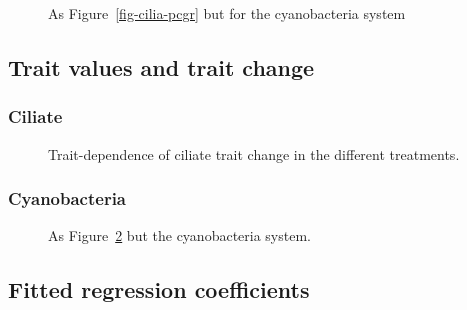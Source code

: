 \documentclass[
  letterpaper,
  DIV=11,
  numbers=noendperiod]{scrartcl}
\begin{document}
\begin{figure}


\caption{\label{fig-cyano-pcgr}As Figure~\ref{fig-cilia-pcgr} but for
the cyanobacteria system}

\end{figure}%

\subsection{Trait values and trait
change}\label{trait-values-and-trait-change}

\subsubsection{Ciliate}\label{ciliate-2}

\begin{figure}


\caption{\label{fig-cilia-dT}Trait-dependence of ciliate trait change in
the different treatments.}

\end{figure}%

\subsubsection{Cyanobacteria}\label{cyanobacteria-2}

\begin{figure}


\caption{\label{fig-cyano-dT}As Figure~\ref{fig-cilia-dT} but the
cyanobacteria system.}

\end{figure}%

\subsection{Fitted regression
coefficients}\label{fitted-regression-coefficients}
\end{document}
